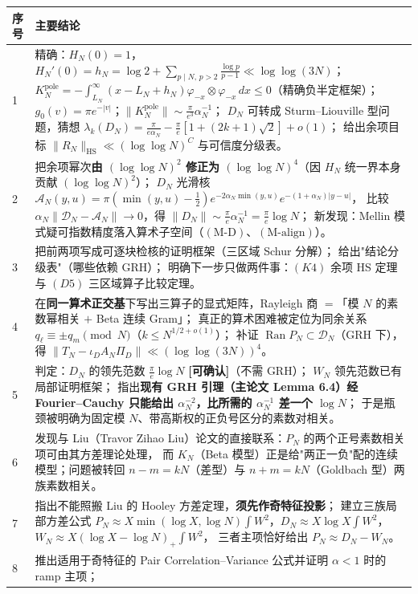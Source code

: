 \documentclass[11pt,a4paper]{ctexart}
\newcommand{\HS}{\mathrm{HS}}
\newcommand{\pole}{\mathrm{pole}}
\newcommand{\Dk}{\mathcal{D}}
\newcommand{\Ak}{\mathcal{A}}
\newcommand{\al}{\alpha_{N}}
\newcommand{\LN}{L_{N}}
\newcommand{\OK}{\textcolor{green!45!black}{\textbf{[可确认]}}}
\begin{document}
\begin{longtable}{@{}p{1.05cm}p{13.6cm}@{}}
\toprule
序号 & 主要结论 \\
\midrule
\endhead
1 &
精确：$H_N(0)=1$，$H_N'(0)=h_N=\log2+\sum_{p\mid N,\,p>2}\frac{\log p}{p-1}\ll\log\log(3N)$；
$K_N^{\pole}=-\int_{\LN}^{\infty}(x-\LN+h_N)\varphi_{-x}\otimes\varphi_{-x}\,dx\le0$（精确负半定框架）；
$g_0(v)=\pi e^{-|v|}$；$\|K_N^{\pole}\|\sim\frac{\pi}{e^3}\al^{-1}$；
$D_N$ 可转成 Sturm--Liouville 型问题，猜想 $\lambda_k(D_N)=\frac{\pi}{e\al}-\frac{\pi}{e}[1+(2k+1)\sqrt2]+o(1)$；
给出余项目标 $\|R_N\|_{\HS}\ll(\log\log N)^C$ 与可信度分级表。\\
2 &
把余项幂次\textbf{由 $(\log\log N)^2$ 修正为 $(\log\log N)^4$}（因 $H_N$ 统一界本身贡献 $(\log\log N)^2$）；
$D_N$ 光滑核 $\Ak_N(y,u)=\pi(\min(y,u)-\tfrac12)e^{-2\al\min(y,u)}e^{-(1+\al)|y-u|}$，
比较 $\al\|\Dk_N-\Ak_N\|\to0$，得 $\|D_N\|\sim\frac{\pi}{e}\al^{-1}=\frac{\pi}{e}\log N$；
新发现：Mellin 模式疑可指数精度落入算术子空间（$(\mathrm{M\text{-}D})$、$(\mathrm{M\text{-}align})$）。\\
3 &
把前两项写成可逐块检核的证明框架（三区域 Schur 分解）；
给出"结论分级表"（哪些依赖 GRH）；
明确下一步只做两件事：$(K4)$ 余项 HS 定理与 $(D5)$ 三区域算子比较定理。\\
4 &
在\textbf{同一算术正交基}下写出三算子的显式矩阵，Rayleigh 商 $=$「模 $N$ 的素数幂相关 $+$ Beta 连续 Gram」；
真正的算术困难被定位为同余关系 $q_\ell\equiv\pm q_m\pmod N$（$k\le N^{1/2+o(1)}$）；
补证 $\operatorname{Ran}P_N\subset\mathcal D_N$（GRH 下），得
$\|T_N-\iota_DA_N\Pi_D\|\ll(\log\log(3N))^4$。\\
5 &
判定：$D_N$ 的领先范数 $\frac{\pi}{e}\log N$ \OK（不需 GRH）；
$W_N$ 领先范数已有局部证明框架；
指出\textbf{现有 GRH 引理（主论文 Lemma 6.4）经 Fourier--Cauchy 只能给出 $\al^{-2}$，比所需的 $\al^{-1}$ 差一个 $\log N$}；
于是瓶颈被明确为固定模 $N$、带高斯权的正负号区分的素数对相关。\\
6 &
发现与 Liu（Travor Zihao Liu）论文的直接联系：$P_N$ 的两个正号素数相关项可由其方差理论处理，
而 $K_N$（Beta 模型）正是给"两正一负"配的连续模型；问题被转回
$n-m=kN$（差型）与 $n+m=kN$（Goldbach 型）两族素数相关。\\
7 &
指出不能照搬 Liu 的 Hooley 方差定理，\textbf{须先作奇特征投影}；
建立三族局部方差公式
$P_N\approx X\min(\log X,\log N)\int W^2$，$D_N\approx X\log X\int W^2$，
$W_N\approx X(\log X-\log N)_+\int W^2$，
三者主项恰好给出 $P_N\approx D_N-W_N$。\\
8 &
推出适用于奇特征的 Pair Correlation--Variance 公式并证明 $\alpha<1$ 时的 ramp 主项；

\end{longtable}
\end{document}
